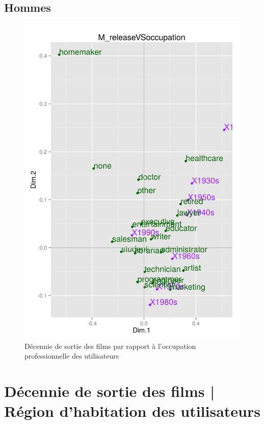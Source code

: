 \documentclass[11pt]{article}
\begin{document}
\subsection{Hommes}
\begin{figure}[htd]
\centering
\includegraphics[scale=0.65]{./images/M_releaseVSoccupation}
\caption{Décennie de sortie des films par rapport à l'occupation professionnelle des utilisateurs}
\end{figure}

\pagebreak
\section{Décennie de sortie des films | Région d'habitation des utilisateurs}
\end{document}
